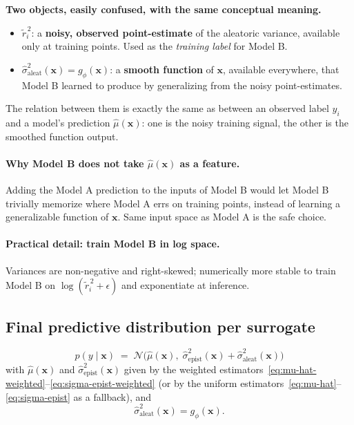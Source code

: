 \documentclass[11pt,a4paper]{article}
\begin{document}
\begin{recapbox}
\textbf{Two objects, easily confused, with the same conceptual meaning.}
\begin{itemize}
    \item $\tilde r_i^{\,2}$: a \textbf{noisy, observed point-estimate} of the aleatoric variance, available only at training points. Used as the \emph{training label} for Model B.
    \item $\hat\sigma^2_{\text{aleat}}(\bm x) = g_\phi(\bm x)$: a \textbf{smooth function} of $\bm x$, available everywhere, that Model B learned to produce by generalizing from the noisy point-estimates.
\end{itemize}
The relation between them is exactly the same as between an observed label $y_i$ and a model's prediction $\hat\mu(\bm x)$: one is the noisy training signal, the other is the smoothed function output.
\end{recapbox}

\paragraph{Why Model B does not take $\hat\mu(\bm x)$ as a feature.} Adding the Model A prediction to the inputs of Model B would let Model B trivially memorize where Model A errs on training points, instead of learning a generalizable function of $\bm x$. Same input space as Model A is the safe choice.

\paragraph{Practical detail: train Model B in log space.} Variances are non-negative and right-skewed; numerically more stable to train Model B on $\log(\tilde r_i^{\,2} + \epsilon)$ and exponentiate at inference.

\subsection{Final predictive distribution per surrogate}

\begin{equation}
\boxed{\;
p(y \mid \bm x) \;=\; \mathcal{N}\!\Big( \hat\mu(\bm x), \; \hat\sigma^2_{\text{epist}}(\bm x) + \hat\sigma^2_{\text{aleat}}(\bm x) \Big)
\;}
\label{eq:predictive-dist}
\end{equation}
with $\hat\mu(\bm x)$ and $\hat\sigma^2_{\text{epist}}(\bm x)$ given by the weighted estimators~\eqref{eq:mu-hat-weighted}--\eqref{eq:sigma-epist-weighted} (or by the uniform estimators~\eqref{eq:mu-hat}--\eqref{eq:sigma-epist} as a fallback), and
\[
\hat\sigma^2_{\text{aleat}}(\bm x) = g_\phi(\bm x).
\]
\end{document}

